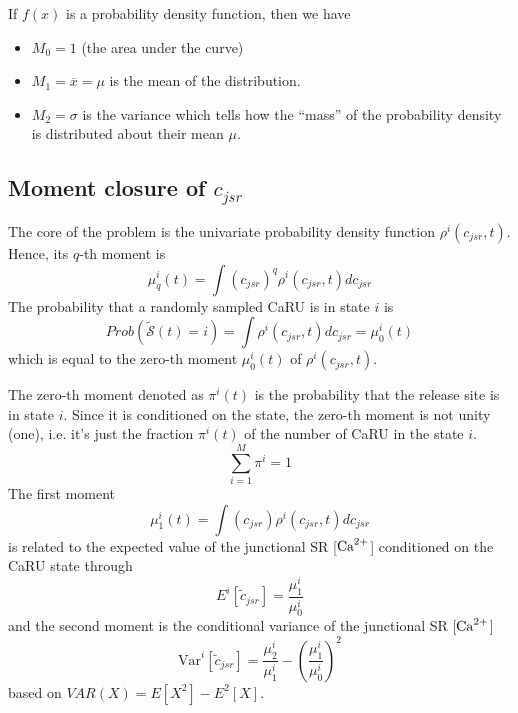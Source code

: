 If $f(x)$ is a probability density function, then we have
\begin{itemize}
\item $M_0=1$ (the area under the curve)
\item $M_1=\overline{x} = \mu$ is the mean of the distribution.
\item $M_2=\sigma$ is the variance which tells how the ``mass'' of the
  probability density is distributed about their mean $\mu$.
\end{itemize}

\subsection{Moment closure of $c_{jsr}$}
\label{sec:moment-closure-c_jsr}


The core of the problem is the univariate probability density function
$\rho^i(c_{jsr},t)$. Hence, its $q$-th moment is
\begin{equation}
  \label{eq:218}
  \mu^i_q(t) = \int (c_{jsr})^q \rho^i(c_{jsr},t) dc_{jsr}
\end{equation}
The probability that a randomly sampled CaRU is in state $i$ is
\begin{equation}
  \label{eq:219}
  Prob(\tilde{\mathcal{S}}(t) = i) = \int \rho^i(c_{jsr},t)dc_{jsr} = \mu^i_0(t)
\end{equation}
which is equal to the zero-th moment $\mu^i_0(t)$ of
$\rho^i(c_{jsr},t)$. 

The zero-th moment denoted as $\pi^i(t)$ is the probability that the
release site is in state $i$.  Since it is conditioned on the state,
the zero-th moment is not unity (one), i.e. it's just the fraction
$\pi^i(t)$ of the number of CaRU in the state $i$.
\begin{equation}
  \label{eq:230}
  \sum_{i=1}^{M} \pi^i = 1
\end{equation}
The first moment
\begin{equation}
  \label{eq:231}
  \mu^i_1(t) = \int (c_{jsr}) \rho^i(c_{jsr},t) dc_{jsr}
\end{equation}
is related to the expected value of the junctional SR [${\text{Ca}^{2+}}$] conditioned on
the CaRU state through
\begin{equation}
  \label{eq:232}
  E^i[\tilde{c}_{jsr}] = \frac{\mu^i_1}{\mu^i_0}
\end{equation}
and the second moment is the conditional variance of the junctional SR [${\text{Ca}^{2+}}$]
\begin{equation}
  \label{eq:233}
  \text{Var}^i[\tilde{c}_{jsr}] = \frac{\mu^i_2}{\mu^i_1} - (\frac{\mu^i_1}{\mu^i_0})^2
\end{equation}
based on $VAR(X) = E[X^2]-E^2[X]$.

